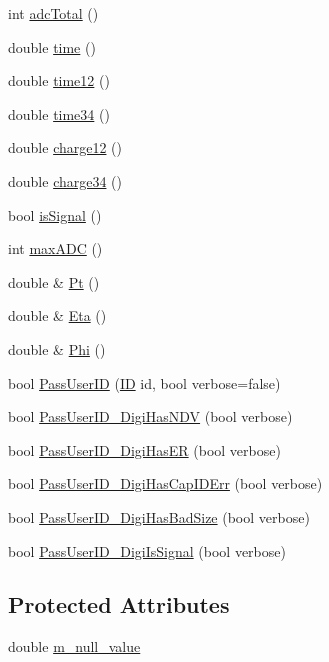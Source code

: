 \begin{DoxyCompactItemize}
\item 
int \hyperlink{class_hcal_digi_a24ca24cbc2ea356627ddcff20c308846}{adc\+Total} ()
\item 
double \hyperlink{class_hcal_digi_a11e29234e593020716fea46884cdb850}{time} ()
\item 
double \hyperlink{class_hcal_digi_a9d7d21b996bfffcac0543d43d167c5ea}{time12} ()
\item 
double \hyperlink{class_hcal_digi_a298c1a07be693c4b7eb575ff73986d3a}{time34} ()
\item 
double \hyperlink{class_hcal_digi_ab6a0cbf1a35a0fb01eb91e8cd90f4cb2}{charge12} ()
\item 
double \hyperlink{class_hcal_digi_aee6d8c5093f2a13ea727f9582893bfa0}{charge34} ()
\item 
bool \hyperlink{class_hcal_digi_a533e89804901926f571c8bf5ab3a28d9}{is\+Signal} ()
\item 
int \hyperlink{class_hcal_digi_a1b0ece60d015d716a91cde135caefb34}{max\+A\+D\+C} ()
\item 
double \& \hyperlink{class_hcal_digi_a97f21992c1e45b427ce09dcca581e0f5}{Pt} ()
\item 
double \& \hyperlink{class_hcal_digi_a84be4fe4f387b7b67da4161b70e6254a}{Eta} ()
\item 
double \& \hyperlink{class_hcal_digi_a3cc5e61af592f544a573f2bd8d0292f7}{Phi} ()
\item 
bool \hyperlink{class_hcal_digi_aff5580b98a1dc9155ee316ea30c52701}{Pass\+User\+I\+D} (\hyperlink{_i_d_types_8h_a094c367727273b4da2b960ca3b3edc06}{I\+D} id, bool verbose=false)
\item 
bool \hyperlink{class_hcal_digi_ad46ecbe02799bfd4f955d16d6cc8a634}{Pass\+User\+I\+D\+\_\+\+Digi\+Has\+N\+D\+V} (bool verbose)
\item 
bool \hyperlink{class_hcal_digi_a37f77ef16bee597453274322be29b9d3}{Pass\+User\+I\+D\+\_\+\+Digi\+Has\+E\+R} (bool verbose)
\item 
bool \hyperlink{class_hcal_digi_ad67d910037f433d03888ab45d12cbe1b}{Pass\+User\+I\+D\+\_\+\+Digi\+Has\+Cap\+I\+D\+Err} (bool verbose)
\item 
bool \hyperlink{class_hcal_digi_a2a05f5e8ab79e930d4eb421c4569d374}{Pass\+User\+I\+D\+\_\+\+Digi\+Has\+Bad\+Size} (bool verbose)
\item 
bool \hyperlink{class_hcal_digi_a515c743373f90bdfe0a43297cb7e957b}{Pass\+User\+I\+D\+\_\+\+Digi\+Is\+Signal} (bool verbose)
\end{DoxyCompactItemize}
\subsection*{Protected Attributes}
\begin{DoxyCompactItemize}
\item 
double \hyperlink{class_hcal_digi_a4829a0f328a240dd236569a3cf717c4f}{m\+\_\+null\+\_\+value}
\end{DoxyCompactItemize}


